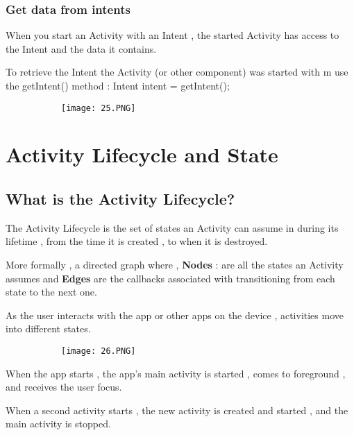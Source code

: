 \documentclass{article}
\begin{document}
\vspace{50mm}

\subsubsection{Get data from intents}

When you start an Activity with an Intent , the started Activity has access to the Intent and the data it contains.

To retrieve the Intent the Activity (or other component) was started with m use the getIntent() method : Intent intent = getIntent();

      \begin{figure}[ht!]
  \centering
  \begin{subfigure}[b]{0.7\linewidth}
    \texttt{[image: 25.PNG]}
  \end{subfigure}
  \end{figure}


\section{Activity Lifecycle and State}

\subsection{What is the Activity Lifecycle?}

The Activity Lifecycle is the set of states an Activity can assume in during its lifetime , from the time it is created , to when it is destroyed.

More formally , a directed graph where , \textbf{Nodes} : are all the states an Activity assumes and \textbf{Edges} are the callbacks associated with transitioning from each state to the next one.

As the user interacts with the app or other apps on the device , activities move into different states.


      \begin{figure}[ht!]
  \centering
  \begin{subfigure}[b]{0.7\linewidth}
    \texttt{[image: 26.PNG]}
  \end{subfigure}
  \end{figure}

When the app starts , the app's main activity is started , comes to foreground , and receives the user focus.

When a second activity starts , the new activity is created and started , and the main activity is stopped.
\end{document}
